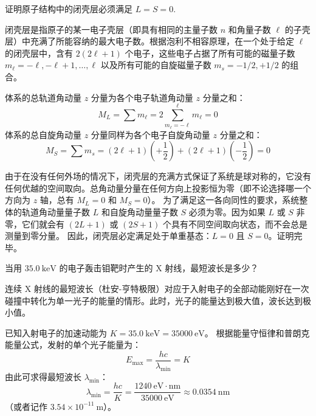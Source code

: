 \begin{exercise}\label{ex:25.9}
证明原子结构中的闭壳层必须满足 $L=S=0$.
\end{exercise}
\begin{solution}
闭壳层是指原子的某一电子壳层（即具有相同的主量子数 $n$ 和角量子数 $\ell$ 的子壳层）中充满了所能容纳的最大电子数。根据泡利不相容原理，在一个处于给定 $\ell$ 的闭壳层中，含有 $2(2\ell+1)$ 个电子，这些电子占据了所有可能的磁量子数 $m_\ell = -\ell, -\ell+1, \dots, \ell$ 以及所有可能的自旋磁量子数 $m_s = -1/2, +1/2$ 的组合。

体系的总轨道角动量 $z$ 分量为各个电子轨道角动量 $z$ 分量之和：
$$ M_L = \sum m_\ell = 2 \sum_{m_\ell = -\ell}^{\ell} m_\ell = 0 $$
体系的总自旋角动量 $z$ 分量同样为各个电子自旋角动量 $z$ 分量之和：
$$ M_S = \sum m_s = (2\ell+1) \left( +\frac{1}{2} \right) + (2\ell+1) \left( -\frac{1}{2} \right) = 0 $$

由于在没有任何外场的情况下，闭壳层的充满方式保证了系统是球对称的，它没有任何优越的空间取向。总角动量分量在任何方向上投影恒为零（即不论选择哪一个方向为 $z$ 轴，总有 $M_L = 0$ 和 $M_S = 0$）。
为了满足这一各向同性的要求，系统整体的轨道角动量量子数 $L$ 和自旋角动量量子数 $S$ 必须为零。因为如果 $L$ 或 $S$ 非零，它们就会有 $(2L+1)$ 或 $(2S+1)$ 个具有不同空间取向状态，而不会总是测量到零分量。
因此，闭壳层必定满足处于单重基态：$L = 0$ 且 $S = 0$。证明完毕。
\end{solution}

\begin{exercise}\label{ex:25.10}
当用 $35.0 \ \mathrm{keV}$ 的电子轰击钼靶时产生的 $\mathrm{X}$ 射线，最短波长是多少？
\end{exercise}
\begin{solution}
连续 $\mathrm{X}$ 射线的最短波长（杜安-亨特极限）对应于入射电子的全部动能刚好在一次碰撞中转化为单一光子的能量的情形。此时，光子的能量达到极大值，波长达到极小值。

已知入射电子的加速动能为 $K = 35.0 \ \mathrm{keV} = 35000 \ \mathrm{eV}$。
根据能量守恒律和普朗克能量公式，发射的单个光子能量为：
$$ E_{\max} = \frac{hc}{\lambda_{\min}} = K $$
由此可求得最短波长 $\lambda_{\min}$：
$$ \lambda_{\min} = \frac{hc}{K} = \frac{1240 \ \mathrm{eV \cdot nm}}{35000 \ \mathrm{eV}} \approx 0.0354 \ \mathrm{nm} $$
（或者记作 $3.54 \times 10^{-11} \ \mathrm{m}$）。
\end{solution}

